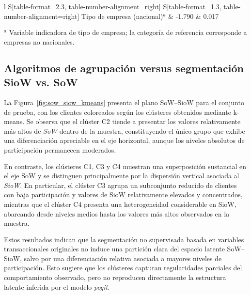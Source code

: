 \begin{table}[ht]
\begin{threeparttable}
\begin{tabular}{
    l
    S[table-format=2.3, table-number-alignment=right]
    S[table-format=1.3, table-number-alignment=right]
    }
    Tipo de empresa (nacional)$^{a}$
    & -1.790
    & 0.017 \\
    
    \bottomrule
    \end{tabular}
    
    \begin{tablenotes}[flushleft]
    \footnotesize
    \item $^{a}$ Variable indicadora de tipo de empresa; la categoría de referencia corresponde a empresas no nacionales.
    \end{tablenotes}
    
    \end{threeparttable}
\end{table}

    
\subsection{Algoritmos de agrupación versus segmentación SioW vs. SoW}

    La Figura~\ref{fig:sow_siow_kmeans} presenta el plano SoW--SioW para el conjunto de prueba, con los clientes coloreados según los clústeres obtenidos mediante k-means. Se observa que el clúster C2 tiende a presentar los valores relativamente más altos de
    \emph{SoW} dentro de la muestra, constituyendo el único grupo que exhibe una diferenciación apreciable en el eje horizontal, aunque los niveles absolutos de participación permanecen moderados.
    
    En contraste, los clústeres C1, C3 y C4 muestran una superposición sustancial en el eje SoW y se distinguen principalmente por la dispersión vertical asociada al
    \emph{SioW}. En particular, el clúster C3 agrupa un subconjunto reducido de clientes con baja participación y valores de SioW relativamente elevados y concentrados, mientras que el clúster C4 presenta una heterogeneidad considerable en SioW, abarcando desde niveles medios hasta los valores más altos observados en la
    muestra.
    
    Estos resultados indican que la segmentación no supervisada basada en
    variables transaccionales originales no induce una partición clara del espacio latente SoW--SioW, salvo por una diferenciación relativa asociada a mayores niveles de participación. Esto sugiere que los clústeres capturan regularidades parciales del
    comportamiento observado, pero no reproducen directamente la estructura latente inferida por el modelo \emph{pogit}.


